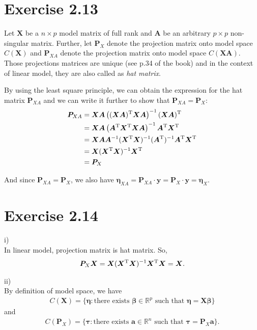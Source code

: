 \documentclass[a4paper]{article}
\begin{document}
\section{Exercise 2.13}
Let $\bm{X}$ be a $n \times p$ model matrix of full rank and $\bm{A}$ be an arbitrary $p \times p$ non-singular matrix. Further, let $\bm{P}_{X}$ denote the projection matrix onto model space $C(\bm{X})$ and $\bm{P}_{XA}$ denote the projection matrix onto model space $C(\bm{XA})$. Those projections matrices are unique (see p.34 of the book) and in the context of linear model, they are also called as \textit{hat matrix}.

By using the least square principle, we can obtain the expression for the hat matrix $\bm{P}_{XA}$ and we can write it further to show that $\bm{P}_{XA} = \bm{P}_{X}$:
\begin{align*}
\bm{P}_{XA} &= \bm{X}\bm{A}\left((\bm{X}\bm{A})^{\rm T}\bm{X}\bm{A}\right)^{-1}(\bm{X}\bm{A})^{\rm T}\\
&= \bm{X}\bm{A}\left(\bm{A}^{\rm T}\bm{X}^{\rm T}\bm{X}\bm{A} \right)^{-1}\bm{A}^{\rm T}\bm{X}^{\rm T}\\
&= \bm{X}\bm{A}\bm{A}^{-1}(\bm{X}^{\rm T}\bm{X})^{-1}(\bm{A}^{\rm T})^{-1}\bm{A}^{\rm T}\bm{X}^{\rm T}\\
&= \bm{X}(\bm{X}^{\rm T}\bm{X})^{-1}\bm{X}^{\rm T}\\
&= \bm{P}_{X}
\end{align*}

And since $\bm{P}_{XA} = \bm{P}_{X}$, we also have $\bm{\eta}_{XA} = \bm{P}_{XA}\cdot\bm{y} = \bm{P}_{X}\cdot\bm{y} = \bm{\eta}_{X}$.


\vspace{\baselineskip}
\section{Exercise 2.14}
i)\\
In linear model, projection matrix is hat matrix. So,
\begin{align*}
\bm{P}_{X}\bm{X} = \bm{X}(\bm{X}^{\rm T}\bm{X})^{-1}\bm{X}^{\rm T}\bm{X} = \bm{X}.
\end{align*}

ii)\\
By definition of model space, we have
\begin{align*}
C(\bm{X}) = \{\bm{\eta}: \mbox{there exists $\bm{\beta} \in \mathbb{R}^{p}$ such that $\bm{\eta} = \bm{X}\bm{\beta}$}\}
\end{align*}
and
\begin{align*}
C(\bm{P}_{X}) = \{\bm{\tau}: \mbox{there exists $\bm{a} \in \mathbb{R}^{n}$ such that $\bm{\tau} = \bm{P}_{X}\bm{a}$}\}.
\end{align*}
\end{document}
